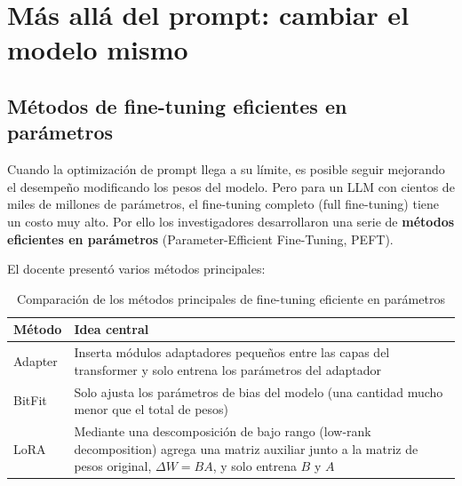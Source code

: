 \section{Más allá del prompt: cambiar el modelo mismo}

\subsection{Métodos de fine-tuning eficientes en parámetros}

Cuando la optimización de prompt llega a su límite, es posible seguir mejorando el desempeño modificando los pesos del modelo. Pero para un LLM con cientos de miles de millones de parámetros, el fine-tuning completo (full fine-tuning) tiene un costo muy alto. Por ello los investigadores desarrollaron una serie de \textbf{métodos eficientes en parámetros} (Parameter-Efficient Fine-Tuning, PEFT).

El docente presentó varios métodos principales:

\begin{table}[H]
\centering
\begin{tabular}{lp{8cm}}
\toprule
\textbf{Método} & \textbf{Idea central} \\
\midrule
Adapter & Inserta módulos adaptadores pequeños entre las capas del transformer y solo entrena los parámetros del adaptador \\
BitFit  & Solo ajusta los parámetros de bias del modelo (una cantidad mucho menor que el total de pesos) \\
LoRA    & Mediante una descomposición de bajo rango (low-rank decomposition) agrega una matriz auxiliar junto a la matriz de pesos original, $\Delta W = BA$, y solo entrena $B$ y $A$ \\
\bottomrule
\end{tabular}
\caption{Comparación de los métodos principales de fine-tuning eficiente en parámetros}
\end{table}

